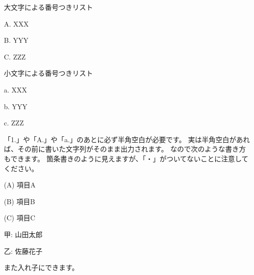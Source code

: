 大文字による番号つきリスト

\begin{starterenumerate}
\item[A.] XXX
\item[B.] YYY
\item[C.] ZZZ
\end{starterenumerate}

小文字による番号つきリスト

\begin{starterenumerate}
\item[a.] XXX
\item[b.] YYY
\item[c.] ZZZ
\end{starterenumerate}

\endstarterresult

「1.」や「A.」や「a.」のあとに必ず半角空白が必要です。
実は半角空白があれば、その前に書いた文字列がそのまま出力されます。
なので次のような書き方もできます。
箇条書きのように見えますが、「・」がついてないことに注意してください。

\begin{starterprogram}\end{starterprogram}
\noindent
{}

\starterresult

\begin{starterenumerate}
\item[(A)] 項目A
\item[(B)] 項目B
\item[(C)] 項目C
\end{starterenumerate}

\begin{starterenumerate}
\item[甲:] 山田太郎
\item[乙:] 佐藤花子
\end{starterenumerate}

\endstarterresult

また入れ子にできます。

\begin{starterprogram}\end{starterprogram}
\noindent
{}

